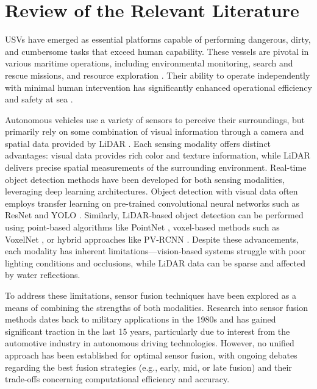 \documentclass{erauthesis}
\begin{document}
\chapter{Review of the Relevant Literature}


\acp{USV} have emerged as essential platforms capable of performing dangerous, dirty, and cumbersome tasks that exceed human capability. These vessels are pivotal in various maritime operations, including environmental monitoring, search and rescue missions, and resource exploration \cite{liebergall, eckstein2024}.%
Their ability to operate independently with minimal human intervention has significantly enhanced operational efficiency and safety at sea \cite{bai2022}.%

Autonomous vehicles use a variety of sensors to perceive their surroundings, but primarily rely on some combination of visual information through a camera and spatial data provided by \ac{LiDAR} \cite{yeong2021}.%
Each sensing modality offers distinct advantages: visual data provides rich color and texture information, while \ac{LiDAR} delivers precise spatial measurements of the surrounding environment.
Real-time object detection methods have been developed for both sensing modalities, leveraging deep learning architectures.
Object detection with visual data often employs transfer learning on pre-trained convolutional neural networks such as ResNet \cite{he2016} and \ac{YOLO} \cite{ultralytics}.%
Similarly, \ac{LiDAR}-based object detection can be performed using point-based algorithms like PointNet \cite{garcia-garcia2016}, voxel-based methods such as VoxelNet \cite{zhou2018a}, or hybrid approaches like PV-RCNN \cite{shi2021}.%
Despite these advancements, each modality has inherent limitations—vision-based systems struggle with poor lighting conditions and occlusions, while \ac{LiDAR} data can be sparse and affected by water reflections.

To address these limitations, sensor fusion techniques have been explored as a means of combining the strengths of both modalities. 
Research into sensor fusion methods dates back to military applications in the 1980s and has gained significant traction in the last 15 years, particularly due to interest from the automotive industry in autonomous driving technologies. However, no unified approach has been established for optimal sensor fusion, with ongoing debates regarding the best fusion strategies (e.g., early, mid, or late fusion) and their trade-offs concerning computational efficiency and accuracy.
\end{document}

